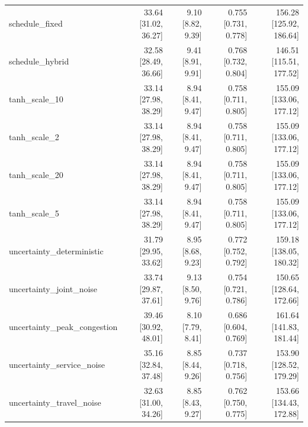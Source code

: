 \begin{tabular}{lrrrr}
schedule\_fixed & 33.64 [31.02, 36.27] & 9.10 [8.82, 9.39] & 0.755 [0.731, 0.778] & 156.28 [125.92, 186.64] \\
schedule\_hybrid & 32.58 [28.49, 36.66] & 9.41 [8.91, 9.91] & 0.768 [0.732, 0.804] & 146.51 [115.51, 177.52] \\
tanh\_scale\_10 & 33.14 [27.98, 38.29] & 8.94 [8.41, 9.47] & 0.758 [0.711, 0.805] & 155.09 [133.06, 177.12] \\
tanh\_scale\_2 & 33.14 [27.98, 38.29] & 8.94 [8.41, 9.47] & 0.758 [0.711, 0.805] & 155.09 [133.06, 177.12] \\
tanh\_scale\_20 & 33.14 [27.98, 38.29] & 8.94 [8.41, 9.47] & 0.758 [0.711, 0.805] & 155.09 [133.06, 177.12] \\
tanh\_scale\_5 & 33.14 [27.98, 38.29] & 8.94 [8.41, 9.47] & 0.758 [0.711, 0.805] & 155.09 [133.06, 177.12] \\
uncertainty\_deterministic & 31.79 [29.95, 33.62] & 8.95 [8.68, 9.23] & 0.772 [0.752, 0.792] & 159.18 [138.05, 180.32] \\
uncertainty\_joint\_noise & 33.74 [29.87, 37.61] & 9.13 [8.50, 9.76] & 0.754 [0.721, 0.786] & 150.65 [128.64, 172.66] \\
uncertainty\_peak\_congestion & 39.46 [30.92, 48.01] & 8.10 [7.79, 8.41] & 0.686 [0.604, 0.769] & 161.64 [141.83, 181.44] \\
uncertainty\_service\_noise & 35.16 [32.84, 37.48] & 8.85 [8.44, 9.26] & 0.737 [0.718, 0.756] & 153.90 [128.52, 179.29] \\
uncertainty\_travel\_noise & 32.63 [31.00, 34.26] & 8.85 [8.43, 9.27] & 0.762 [0.750, 0.775] & 153.66 [134.43, 172.88] \\
\bottomrule
\end{tabular}
